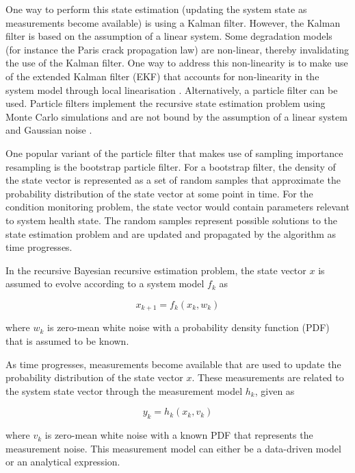 One way to perform this state estimation (updating the system state as measurements become available) is using a Kalman filter. However, the Kalman filter is based on the assumption of a linear system. Some degradation models (for instance the Paris crack propagation law) are non-linear, thereby invalidating the use of the Kalman filter. One way to address this non-linearity is to make use of the extended Kalman filter (EKF) that accounts for non-linearity in the system model through local linearisation \citep{Arulampalam2002}. Alternatively, a particle filter can be used. Particle filters implement the recursive state estimation problem using Monte Carlo simulations \citep{Arulampalam2002} and are not bound by the assumption of a linear system and Gaussian noise \citep{Gordon1993}. 

One popular variant of the particle filter that makes use of sampling importance resampling is the bootstrap particle filter. For a bootstrap filter, the density of the state vector is represented as a set of random samples that approximate the probability distribution of the state vector at some point in time. For the condition monitoring problem, the state vector would contain parameters relevant to system health state.  The random samples represent possible solutions to the state estimation problem and are updated and propagated by the algorithm as time progresses. 

In the recursive Bayesian recursive estimation problem, the state vector $x$ is assumed to evolve according to a system model $f_k$  as 

\begin{equation}
x_{k+1}=f_{k}\left(x_{k}, w_{k}\right)
\label{eq:state}
\end{equation}

where $w_{k}$ is zero-mean white noise with a probability density function (PDF) that is assumed to be known.

As time progresses, measurements become available that are used to update the probability distribution of the state vector $x$. These measurements are related to the system state vector through the measurement model $h_k$, given as 

\begin{equation}
y_{k}=h_{k}\left(x_{k}, v_{k}\right)
\end{equation}

where $v_{k}$ is zero-mean white noise with a known PDF that represents the measurement noise. This measurement model can either be a data-driven model or an analytical expression.

